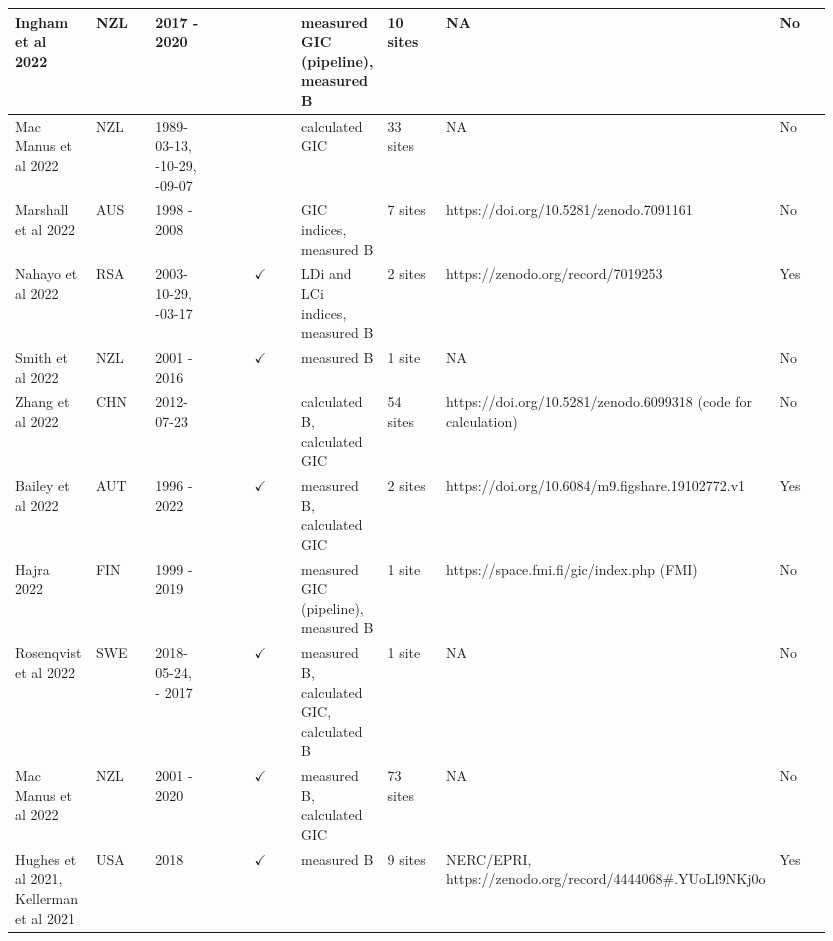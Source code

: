 \begin{longtable}{p{0.106\linewidth}p{0.106\linewidth}p{0.106\linewidth}p{0.106\linewidth}p{0.106\linewidth}p{0.106\linewidth}p{0.106\linewidth}p{0.106\linewidth}p{0.106\linewidth}}
Ingham et al 2022 & NZL & 2017 - 2020 &  &  & measured GIC (pipeline), \newline measured B & 10 sites & NA & No \\ \hline
Mac Manus et al 2022 & NZL & 1989-03-13, \newline 2003-10-29, \newline 2017-09-07 &  &  & calculated GIC & 33 sites & NA & No \\ \hline
Marshall et al 2022 & AUS & 1998 - 2008 &  &  & GIC indices, \newline measured B & 7 sites & https://doi.org/10.5281/zenodo.7091161 & No \\ \hline
Nahayo et al 2022 & RSA & 2003-10-29, \newline 2015-03-17 &  & $\checkmark$ & LDi and LCi indices, \newline measured B & 2 sites & https://zenodo.org/record/7019253 & Yes \\ \hline
Smith et al 2022 & NZL & 2001 - 2016 &  & $\checkmark$ & measured B & 1 site & NA & No \\ \hline
Zhang et al 2022 & CHN & 2012-07-23 &  &  & calculated B, \newline calculated GIC & 54 sites & https://doi.org/10.5281/zenodo.6099318 (code for calculation) & No \\ \hline
Bailey et al 2022 & AUT & 1996 - 2022 &  & $\checkmark$ & measured B, \newline calculated GIC & 2 sites & https://doi.org/10.6084/m9.figshare.19102772.v1 & Yes \\ \hline
Hajra 2022 & FIN & 1999 - 2019 &  &  & measured GIC (pipeline), \newline measured B & 1 site & https://space.fmi.fi/gic/index.php (FMI) & No \\ \hline
Rosenqvist et al 2022 & SWE & 2018-05-24, \newline 2000 - 2017 &  & $\checkmark$ & measured B, \newline calculated GIC, \newline calculated B & 1 site & NA & No \\ \hline
Mac Manus et al 2022 & NZL & 2001 - 2020 &  & $\checkmark$ & measured B, \newline calculated GIC & 73 sites & NA & No \\ \hline
Hughes et al 2021, \newline Kellerman et al 2021 & USA & 2018 &  & $\checkmark$ & measured B & 9 sites & NERC/EPRI, \newline https://zenodo.org/record/4444068\#.YUoLl9NKj0o & Yes \\ \hline

\end{longtable}

